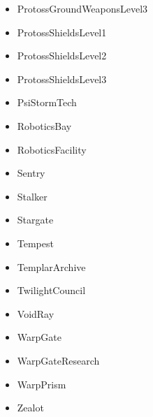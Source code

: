 \begin{anexosenv}
\begin{multicols}{2}
\begin{itemize}
		\item ProtossGroundWeaponsLevel3
		\item ProtossShieldsLevel1
		\item ProtossShieldsLevel2
		\item ProtossShieldsLevel3
		\item PsiStormTech
		\item RoboticsBay
		\item RoboticsFacility
		\item Sentry
		\item Stalker
		\item Stargate
		\item Tempest
		\item TemplarArchive
		\item TwilightCouncil
		\item VoidRay
		\item WarpGate
		\item WarpGateResearch
		\item WarpPrism
		\item Zealot
	\end{itemize}
\end{multicols}


%
%
%
%
%
%
%

\end{anexosenv}


